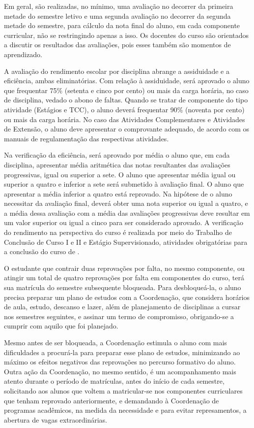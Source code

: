 Em geral, são realizadas, no mínimo, uma avaliação no decorrer da primeira metade do semestre letivo e uma segunda avaliação no decorrer da segunda metade do semestre, para cálculo da nota final do aluno, em cada componente curricular, não se restringindo apenas a isso. Os docentes do curso são orientados a discutir os resultados das avaliações, pois esses também são momentos de aprendizado.

A avaliação do rendimento escolar por disciplina abrange a assiduidade e a eficiência, ambas eliminatórias. Com relação à assiduidade, será aprovado o aluno que frequentar 75\% (setenta e cinco por cento) ou mais da carga horária, no caso de disciplina, vedado o abono de faltas. Quando se tratar de componente do tipo atividade (Estágios e TCC), o aluno deverá frequentar 90\% (noventa por cento) ou mais da carga horária. No caso das Atividades Complementares e Atividades de Extensão, o aluno deve apresentar o comprovante adequado, de acordo com os manuais de regulamentação das respectivas atividades.

Na verificação da eficiência, será aprovado por média o aluno que, em cada disciplina, apresentar média aritmética das notas resultantes das avaliações progressivas, igual ou superior a sete. O aluno que apresentar média igual ou superior a quatro e inferior a sete será submetido à avaliação final. O aluno que apresentar a média inferior a quatro está reprovado. Na hipótese de o aluno necessitar da avaliação final, deverá obter uma nota superior ou igual a quatro, e a média dessa avaliação com a média das avaliações progressivas deve resultar em um valor superior ou igual a cinco para ser considerado aprovado. A verificação do rendimento na perspectiva do curso é realizada por meio do Trabalho de Conclusão de Curso I e II e Estágio Supervisionado, atividades obrigatórias para a conclusão do curso de \nomedocurso.

O estudante que contrair duas reprovações por falta, no mesmo componente, ou atingir um total de quatro reprovações por falta em componentes do curso, terá sua matrícula do semestre subsequente bloqueada. Para desbloqueá-la, o aluno precisa preparar um plano de estudos com a Coordenação, que considera horários de aula, estudo, descanso e lazer, além de planejamento de disciplinas a cursar nos semestres seguintes, e assinar um termo de compromisso, obrigando-se a cumprir com aquilo que foi planejado.

Mesmo antes de ser bloqueada, a Coordenação estimula o aluno com mais dificuldades a procurá-la para preparar esse plano de estudos, minimizando ao máximo os efeitos negativos das reprovações no percurso formativo do aluno. Outra ação da Coordenação, no mesmo sentido, é um acompanhamento mais atento durante o período de matrículas, antes do início de cada semestre, solicitando aos alunos que voltem a matricular-se nos componentes curriculares que tenham reprovado anteriormente, e demandando à Coordenação de programas acadêmicos, na medida da necessidade e para evitar represamentos, a abertura de vagas extraordinárias.

